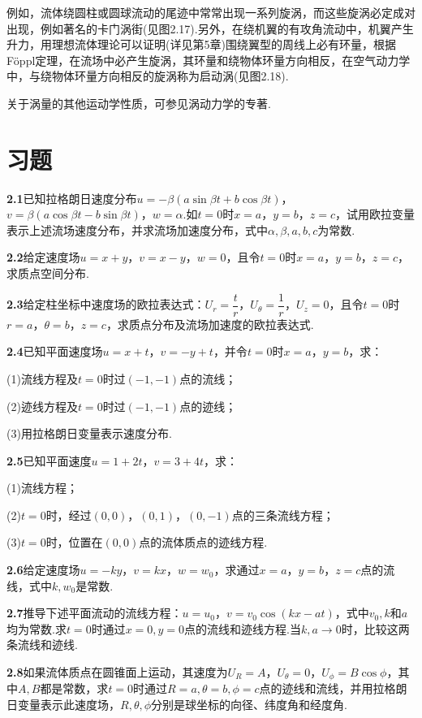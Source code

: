 例如，流体绕圆柱或圆球流动的尾迹中常常出现一系列旋涡，而这些旋涡必定成对出现，例如著名的卡门涡街(见图2.17).另外，在绕机翼的有攻角流动中，机翼产生升力，用理想流体理论可以证明(详见第5章)围绕翼型的周线上必有环量，根据Föppl定理，在流场中必产生旋涡，其环量和绕物体环量方向相反，在空气动力学中，与绕物体环量方向相反的旋涡称为启动涡(见图2.18).

关于涡量的其他运动学性质，可参见涡动力学的专著.
\section*{习题}

\noindent\textbf{2.1}\quad 已知拉格朗日速度分布$u=-\beta(a\sin\beta t+b\cos\beta t)$，$v=\beta(a\cos\beta t-b\sin\beta t)$，$w=\alpha$.如$t=0$时$x=a$，$y=b$，$z=c$，试用欧拉变量表示上述流场速度分布，并求流场加速度分布，式中$\alpha,\beta,a,b,c$为常数.

\medskip
\noindent\textbf{2.2}\quad 给定速度场$u=x+y$，$v=x-y$，$w=0$，且令$t=0$时$x=a$，$y=b$，$z=c$，求质点空间分布.

\medskip
\noindent\textbf{2.3}\quad 给定柱坐标中速度场的欧拉表达式：$U_r=\dfrac{t}{r}$，$U_\theta=\dfrac{1}{r}$，$U_z=0$，且令$t=0$时$r=a$，$\theta=b$，$z=c$，求质点分布及流场加速度的欧拉表达式.

\medskip
\noindent\textbf{2.4}\quad 已知平面速度场$u=x+t$，$v=-y+t$，并令$t=0$时$x=a$，$y=b$，求：

(1)流线方程及$t=0$时过$(-1,-1)$点的流线；

(2)迹线方程及$t=0$时过$(-1,-1)$点的迹线；

(3)用拉格朗日变量表示速度分布.

\medskip
\noindent\textbf{2.5}\quad 已知平面速度$u=1+2t$，$v=3+4t$，求：

(1)流线方程；

(2)$t=0$时，经过$(0,0)$，$(0,1)$，$(0,-1)$点的三条流线方程；

(3)$t=0$时，位置在$(0,0)$点的流体质点的迹线方程.

\medskip
\noindent\textbf{2.6}\quad 给定速度场$u=-ky$，$v=kx$，$w=w_0$，求通过$x=a$，$y=b$，$z=c$点的流线，式中$k,w_0$是常数.

\medskip
\noindent\textbf{2.7}\quad 推导下述平面流动的流线方程：$u=u_0$，$v=v_0\cos(kx-at)$，式中$v_0,k$和$a$均为常数.求$t=0$时通过$x=0,y=0$点的流线和迹线方程.当$k,a\to 0$时，比较这两条流线和迹线.

\medskip
\noindent\textbf{2.8}\quad 如果流体质点在圆锥面上运动，其速度为$U_R=A$，$U_\theta=0$，$U_\phi=B\cos\phi$，其中$A,B$都是常数，求$t=0$时通过$R=a,\theta=b,\phi=c$点的迹线和流线，并用拉格朗日变量表示此速度场，$R,\theta,\phi$分别是球坐标的向径、纬度角和经度角.

